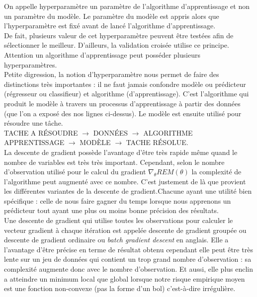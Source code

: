 \documentclass[executivepaper]{article}
\begin{document}
\begin{itemize}
On appelle hyperparamètre un paramètre de l'algorithme d'apprentissage et non un paramètre du modèle. Le paramètre du modèle est appris alors que l'hyperparamètre est fixé avant de lancé l'algorithme d'apprentissage.\\

De fait, plusieurs valeur de cet hyperparamètre peuvent être testées afin de sélectionner le meilleur. D'ailleurs, la validation croisée utilise ce principe.\\

Attention un algorithme d'apprentissage peut posséder plusieurs hyperparamètres.\\

Petite digression, la notion d'hyperparamètre nous permet de faire des distinctions très importantes : il ne faut jamais confondre modèle ou prédicteur (régresseur ou classifieur) et algorithme (d'apprentissage). C'est l'algorithme qui produit le modèle à travers un processus d'apprentissage à partir des données (que l'on a exposé   des nos lignes ci-dessus). Le modèle est ensuite utilisé pour résoudre une tâche.\\

TACHE A RÉSOUDRE $\longrightarrow$ DONNÉES $\longrightarrow$ ALGORITHME APPRENTISSAGE $\longrightarrow$ MODÈLE $\longrightarrow$ TACHE RÉSOLUE.\\

La descente de gradient possède l'avantage d'être très rapide même quand le nombre de variables est très très important. Cependant, selon le nombre d'observation utilisé pour le calcul du gradient $\nabla_\theta REM(\theta)$ la complexité de l'algorithme peut augmenté avec ce nombre. C'est justement de là que provient les différentes variantes de la descente de gradient.Chacune ayant une utilité bien spécifique : celle de nous faire gagner du temps lorsque nous apprenons un prédicteur tout ayant une plus ou moins bonne précision des résultats.\\

Une descente de gradient qui utilise toutes les observations pour calculer le vecteur gradient à chaque itération est appelée descente de gradient groupée ou descente de gradient ordinaire ou \textit{batch gradient descent} en anglais. Elle a l'avantage d'être précise en terme de résultat obtenu cependant elle peut être très lente sur un jeu de données qui contient un trop grand nombre d'observation : sa complexité augmente donc avec le nombre d'observation. Et aussi, elle plus enclin a atteindre un minimum local que global lorsque notre risque empirique moyen est une fonction non-convexe (pas la forme d'un bol) c'est-à-dire irrégulière.\\


\end{itemize}
\end{document}
